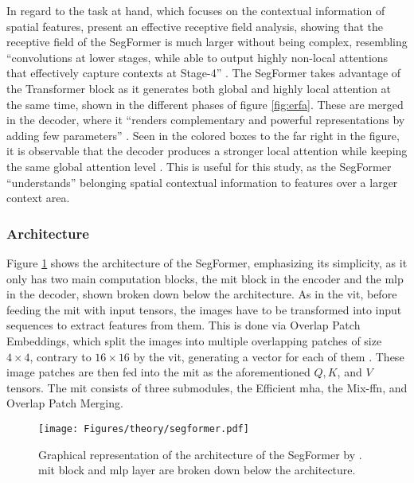 In regard to the task at hand, which focuses on the contextual information of spatial features, \textcite{Xie.Wang.ea2021} present an effective receptive field analysis, showing that the receptive field of the SegFormer is much larger without being complex, resembling \enquote{convolutions at lower stages, while able to output highly non-local attentions that effectively capture contexts at Stage-4} \autocite[5]{Xie.Wang.ea2021}. The SegFormer takes advantage of the Transformer block as it generates both global and highly local attention at the same time, shown in the different phases of figure \ref{fig:erfa}. These are merged in the decoder, where it \enquote{renders complementary and powerful representations by adding few parameters} \autocite[5]{Xie.Wang.ea2021}. Seen in the colored boxes to the far right in the figure, it is observable that the decoder produces a stronger local attention while keeping the same global attention level \autocite{Xie.Wang.ea2021}. This is useful for this study, as the SegFormer \enquote{understands} belonging spatial contextual information to features over a larger context area.

\subsubsection*{Architecture} 

Figure \ref{fig:segformer} shows the architecture of the SegFormer, emphasizing its simplicity, as it only has two main computation blocks, the \gls{mit} block in the encoder and the \gls{mlp} in the decoder, shown broken down below the architecture. As in the \gls{vit}, before feeding the \gls{mit} with input tensors, the images have to be transformed into input sequences to extract features from them. This is done via Overlap Patch Embeddings, which split the images into multiple overlapping patches of size \( 4 \times 4 \), contrary to \( 16 \times 16 \) by the \gls{vit}, generating a vector for each of them \autocite{Lin.Cheng.ea2023,Wang.Wang.ea2023,Xie.Wang.ea2021}. These image patches are then fed into the \gls{mit} as the aforementioned \( Q, K \), and \( V \) tensors. The \gls{mit} consists of three submodules, the Efficient \gls{mha}, the Mix-\gls{ffn}, and Overlap Patch Merging.

\begin{figure}[htb]
    \centering
    \texttt{[image: Figures/theory/segformer.pdf]}
    \caption[SegFormer Architecture]{Graphical representation of the architecture of the SegFormer by \textcite{Xie.Wang.ea2021}. \gls{mit} block and \gls{mlp} layer are broken down below the architecture.}
    \label{fig:segformer}
\end{figure}

